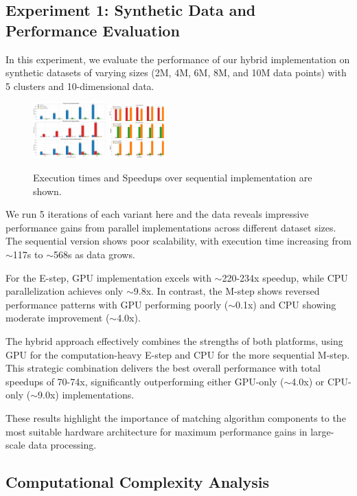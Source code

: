 \documentclass[conference]{IEEEtran}
\begin{document}
\subsection{Experiment 1: Synthetic Data and Performance Evaluation}
In this experiment, we evaluate the performance of our hybrid implementation on synthetic datasets of varying sizes (2M, 4M, 6M, 8M, and 10M data points) with 5 clusters and 10-dimensional data.
\begin{figure}[h!]
\centering
\includegraphics[width=0.25\textwidth]{executionTimes1.png}
\includegraphics[width=0.2\textwidth]{speedups.png}
\caption{Execution times and Speedups over sequential implementation are shown.}
\end{figure}
We run 5 iterations of each variant here and the data reveals impressive performance gains from parallel implementations across different dataset sizes. The sequential version shows poor scalability, with execution time increasing from $\sim$117s to $\sim$568s as data grows.

For the E-step, GPU implementation excels with $\sim$220-234x speedup, while CPU parallelization achieves only $\sim$9.8x. In contrast, the M-step shows reversed performance patterns with GPU performing poorly ($\sim$0.1x) and CPU showing moderate improvement ($\sim$4.0x).

The hybrid approach effectively combines the strengths of both platforms, using GPU for the computation-heavy E-step and CPU for the more sequential M-step. This strategic combination delivers the best overall performance with total speedups of 70-74x, significantly outperforming either GPU-only ($\sim$4.0x) or CPU-only ($\sim$9.0x) implementations.

These results highlight the importance of matching algorithm components to the most suitable hardware architecture for maximum performance gains in large-scale data processing.

\subsection{Computational Complexity Analysis}
\end{document}

